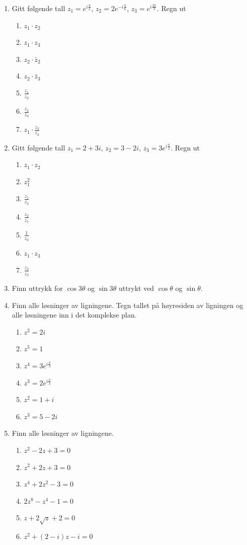 \documentclass[a4paper,norsk,12pt]{article}
\begin{document}
{\begin{multicols}{2}
\begin{enumerate}
\item
Gitt følgende tall $z_1 = e^{i\frac{\pi}{2}}$, $z_2 = 2e^{-i\frac{\pi}{6}}$, $z_3 = e^{i\frac{2\pi}{3}}$. Regn ut
\begin{enumerate}[label=\alph*)]
\item
$z_1\cdot z_2$
\item
$z_1 \cdot z_3$
\item
$z_2\cdot\bar{z}_2$
\item
$z_2\cdot \bar{z}_3$
\item
$\frac{z_1}{z_2}$
\item
$\frac{z_2}{\bar{z}_3}$
\item
$z_1\cdot\frac{z_3}{z_2}$
\end{enumerate}
\item
Gitt følgende tall $z_1 = 2+3i$, $z_2=3-2i$, $z_3 = 3e^{i\frac{\pi}{2}}$. Regn ut
\begin{enumerate}[label=\alph*)]
\item
$z_1\cdot z_2$
\item
$z_1^2$
\item
$\frac{z_1}{z_2}$
\item
$\frac{z_2}{z_1}$
\item
$\frac{1}{z_2}$
\item
$z_1\cdot z_3$
\item
$\frac{z_2}{z_3}$
\end{enumerate}
\item
Finn uttrykk for $\cos3\theta$ og $\sin3\theta$ uttrykt ved $\cos\theta$ og $\sin\theta$. 
\item
Finn alle løsninger av ligningene. Tegn tallet på høyresiden av ligningen og alle løsningene inn i det komplekse plan.
\begin{enumerate}[label=\alph*)]
\item
$z^2 = 2i$
\item
$z^5 = 1$
\item
$z^4 = 3e^{i\frac{\pi}{3}}$
\item
$z^3 = 2e^{i\frac{\pi}{2}}$
\item
$z^2 = 1+i$
\item
$z^3 = 5-2i$
\end{enumerate}
\columnbreak
\item
Finn alle løsninger av ligningene.
\begin{enumerate}[label=\alph*)]
\item
$z^2 - 2z + 3 = 0 $
\item
$z^2 + 2z + 3 = 0$
\item
$z^4 +2z^2 - 3 = 0$
\item
$2z^8 - z^4 - 1 = 0$
\item
$z  + 2\sqrt{z}+2 = 0$
\item
$z^2 + (2-i)z - i = 0$

\end{enumerate}
\end{enumerate}
\end{multicols}
}
\end{document}
